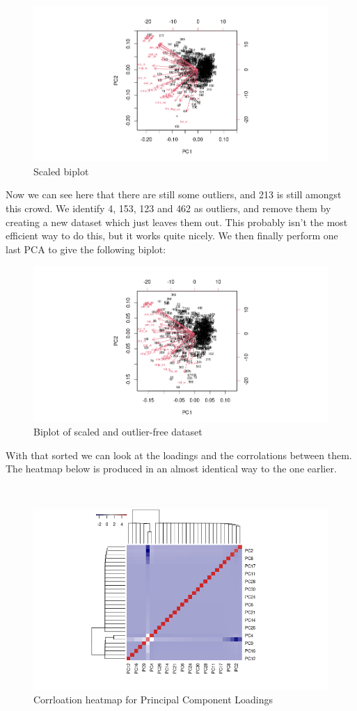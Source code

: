 \documentclass{amsart}
\begin{document}
\begin{figure}[h]
    \centering
    \includegraphics[width=0.8\linewidth]{../../figs/hw2/biplotScaled.png}
    \caption{Scaled biplot}
    
\end{figure}

Now we can see here that there are still some outliers, and 213 is still amongst this crowd. We identify 4, 153, 123 and 462 as outliers, and remove them by creating a new dataset which just leaves them out. This probably isn't the most efficient way to do this, but it works quite nicely. We then finally perform one last PCA to give the following biplot:


\begin{figure}[h]
    \centering
    \includegraphics[width=0.8\linewidth]{../../figs/hw2/finalbiplot.png}
    \caption{Biplot of scaled and outlier-free dataset}
\end{figure}

With that sorted we can look at the loadings and the corrolations between them. The heatmap below is produced in an almost identical way to the one earlier.

\\

\begin{figure}[h]
    \centering
    \includegraphics[width=0.8\linewidth]{../../figs/hw2/pcaCorr.png}
    \caption{Corrloation heatmap for Principal Component Loadings}
\end{figure}
\end{document}
